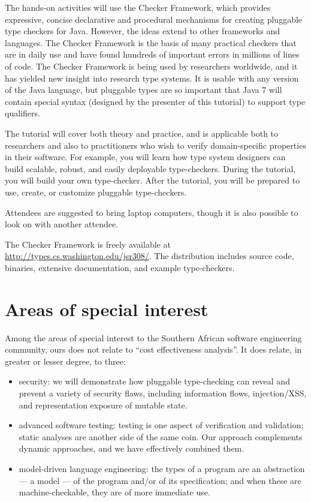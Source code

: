 \documentclass{sig-alternate} %
\begin{document}
The hands-on activities will use the Checker Framework, which provides
expressive, concise declarative and procedural mechanisms for creating
pluggable type checkers for Java. However, the ideas extend to other
frameworks and languages. The Checker Framework is the basis of many
practical checkers that are in daily use and have found hundreds of
important errors in millions of lines of code. The Checker Framework is
being used by researchers worldwide, and it has yielded new insight into
research type systems. It is usable with any version of the Java language,
but pluggable types are so important that Java 7 will contain special
syntax (designed by the presenter of this tutorial) to support type
qualifiers.

The tutorial will cover both theory and practice, and is applicable both to
researchers and also to practitioners who wish to verify domain-specific
properties in their software. For example, you will learn how type system
designers can build scalable, robust, and easily deployable
type-checkers. During the tutorial, you will build your own
type-checker. After the tutorial, you will be prepared to use, create, or
customize pluggable type-checkers.

Attendees are suggested to bring laptop computers, though it is also
possible to look on with another attendee.

The Checker Framework is freely available at
\url{http://types.cs.washington.edu/jsr308/}.
The distribution includes source code, binaries, extensive
documentation, and example type-checkers.



\section{Areas of special interest}

Among the areas of special interest to the Southern African software
engineering community, ours does not relate to ``cost effectiveness
analysis''.  It does relate, in greater or lesser degree, to three:
\begin{itemize}
\item security:  we will demonstrate how pluggable type-checking can reveal
  and prevent a variety of security flaws, including information flows,
  injection/XSS, and representation exposure of mutable state.
\item advanced software testing:
  testing is one aspect of verification and validation; static analyses are
  another side of the same coin.  Our approach complements dynamic
  approaches, and we have effectively combined them.
\item model-driven language engineering:
  the types of a program are an abstraction --- a model --- of the program
  and/or of its specification; and when these are machine-checkable, they
  are of more immediate use.
\end{itemize}
\end{document}
